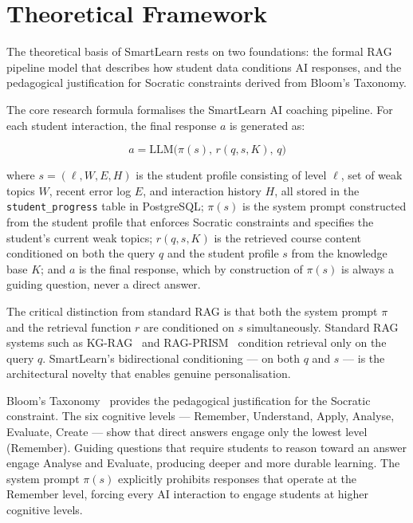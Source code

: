 \documentclass[12pt,a4paper]{report}
\begin{document}
\section{Theoretical Framework}

The theoretical basis of SmartLearn rests on two foundations: the formal RAG pipeline
model that describes how student data conditions AI responses, and the pedagogical
justification for Socratic constraints derived from Bloom's Taxonomy.

The core research formula formalises the SmartLearn AI coaching pipeline. For each
student interaction, the final response $a$ is generated as:

\begin{equation}
a = \mathrm{LLM}\big(\pi(s),\, r(q, s, K),\, q\big)
\label{eq:rag}
\end{equation}

where $s = (\ell, W, E, H)$ is the student profile consisting of level $\ell$, set of
weak topics $W$, recent error log $E$, and interaction history $H$, all stored in the
\texttt{student\_progress} table in PostgreSQL; $\pi(s)$ is the system prompt constructed
from the student profile that enforces Socratic constraints and specifies the student's
current weak topics; $r(q, s, K)$ is the retrieved course content conditioned on both
the query $q$ and the student profile $s$ from the knowledge base $K$; and $a$ is the
final response, which by construction of $\pi(s)$ is always a guiding question, never a
direct answer.

The critical distinction from standard RAG is that both the system prompt $\pi$ and the
retrieval function $r$ are conditioned on $s$ simultaneously. Standard RAG systems such
as KG-RAG~\cite{ref1} and RAG-PRISM~\cite{ref3} condition retrieval only on the query
$q$. SmartLearn's bidirectional conditioning --- on both $q$ and $s$ --- is the
architectural novelty that enables genuine personalisation.

Bloom's Taxonomy~\cite{ref5} provides the pedagogical justification for the Socratic
constraint. The six cognitive levels --- Remember, Understand, Apply, Analyse, Evaluate,
Create --- show that direct answers engage only the lowest level (Remember). Guiding
questions that require students to reason toward an answer engage Analyse and Evaluate,
producing deeper and more durable learning. The system prompt $\pi(s)$ explicitly
prohibits responses that operate at the Remember level, forcing every AI interaction to
engage students at higher cognitive levels.
\end{document}
